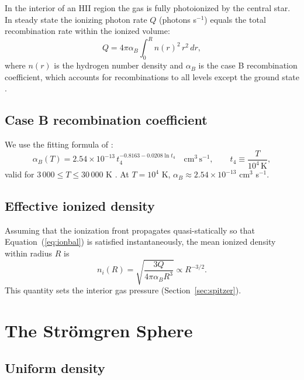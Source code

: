 \documentclass[12pt]{article}
\begin{document}
In the interior of an HII region the gas is fully photoionized by the central
star.  In steady state the ionizing photon rate $Q$ (photons s$^{-1}$) equals
the total recombination rate within the ionized volume:
\begin{equation}
  \label{eq:ionbal}
  Q = 4\pi\alpha_B \int_0^{R} n(r)^2\, r^2\, dr,
\end{equation}
where $n(r)$ is the hydrogen number density and $\alpha_B$ is the case B
recombination coefficient, which accounts for recombinations to all levels
except the ground state \citep{OsterbrockFerland2006}.

\subsection{Case B recombination coefficient}

We use the fitting formula of \citet{Draine2011}:
\begin{equation}
  \label{eq:alphaB}
  \alpha_B(T) = 2.54\times10^{-13}\, t_4^{-0.8163 - 0.0208\ln t_4}
                \quad \mathrm{cm}^3\,\mathrm{s}^{-1},
                \qquad t_4 \equiv \frac{T}{10^4\,\mathrm{K}},
\end{equation}
valid for $3\,000 \le T \le 30\,000$ K \citep{StoreyHummer1995}.  At
$T=10^4$ K, $\alpha_B \approx 2.54\times10^{-13}$ cm$^3$ s$^{-1}$.

\subsection{Effective ionized density}

Assuming that the ionization front propagates quasi-statically so that
Equation~(\ref{eq:ionbal}) is satisfied instantaneously, the mean ionized
density within radius $R$ is
\begin{equation}
  \label{eq:ni}
  n_i(R) = \sqrt{\frac{3Q}{4\pi\alpha_B R^3}} \propto R^{-3/2}.
\end{equation}
This quantity sets the interior gas pressure (Section~\ref{sec:spitzer}).

\section{The Str\"omgren Sphere}
\label{sec:stromgren}

\subsection{Uniform density}
\end{document}

